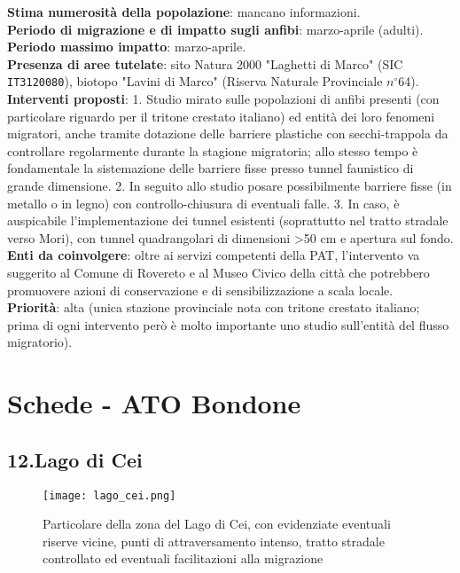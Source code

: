 \documentclass[11pt,a4paper,twoside]{memoir}
\begin{document}
\textbf{Stima numerosità della popolazione}: mancano informazioni. \\
\textbf{Periodo di migrazione e di impatto sugli anfibi}: marzo-aprile (adulti). \\
\textbf{Periodo massimo impatto}: marzo-aprile. \\
\textbf{Presenza di aree tutelate}: sito Natura 2000 "Laghetti di Marco" (SIC \texttt{IT3120080}), biotopo "Lavini di Marco" (Riserva Naturale Provinciale $n^{\circ}$64).
\textbf{Interventi proposti}: 1. Studio mirato sulle popolazioni di anfibi presenti (con particolare riguardo per il tritone crestato italiano) ed entità dei loro fenomeni migratori, anche tramite dotazione delle barriere plastiche con secchi-trappola da controllare regolarmente durante la stagione migratoria; allo stesso tempo è fondamentale la sistemazione delle barriere fisse presso tunnel faunistico di grande dimensione. 2. In seguito allo studio posare possibilmente barriere fisse (in metallo o in legno) con controllo-chiusura di eventuali falle. 3. In caso, è auspicabile l’implementazione dei tunnel esistenti (soprattutto nel tratto stradale verso Mori), con tunnel quadrangolari di dimensioni >50 cm e apertura sul fondo. \\
\textbf{Enti da coinvolgere}: oltre ai servizi competenti della PAT, l’intervento va suggerito al Comune di Rovereto e al Museo Civico della città che potrebbero promuovere azioni di conservazione e di sensibilizzazione a scala locale. \\
\textbf{Priorità}: alta (unica stazione provinciale nota con tritone crestato italiano; prima di ogni intervento però è molto importante uno studio sull'entità del flusso migratorio). \\

\newpage
\section{Schede - ATO Bondone}
\begin{tcolorbox}[breakable,colback=white,colframe=green,width=10cm]
\subsection{12.Lago di Cei}
\end{tcolorbox}

\begin{figure}[H]
\label{fig:map_cei}
\centering
  \texttt{[image: lago\_cei.png]}
\caption{Particolare della zona del Lago di Cei, con evidenziate eventuali riserve vicine, punti di attraversamento intenso, tratto stradale controllato ed eventuali facilitazioni alla migrazione}
\end{figure}
\end{document}
